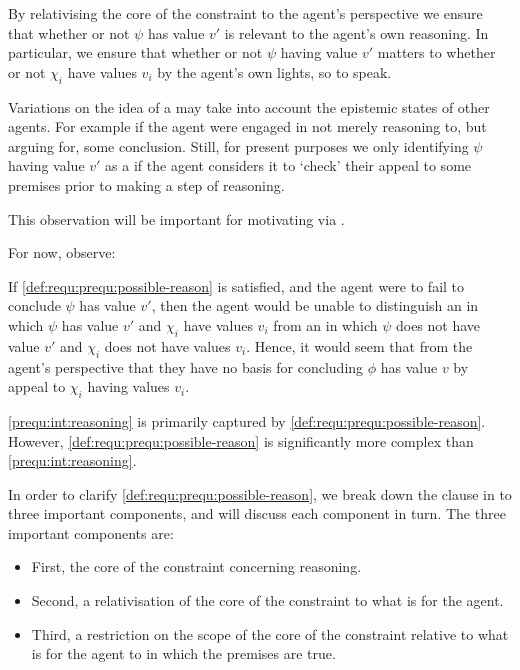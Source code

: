 
\begin{note}[Relevance]
  By relativising the core of the constraint to the agent's perspective we ensure that whether or not \(\psi\) has value \(v'\) is relevant to the agent's own reasoning.
  In particular, we ensure that whether or not \(\psi\) having value \(v'\) matters to whether or not \(\chi_{i}\) have values \(v_{i}\) by the agent's own lights, so to speak.

  Variations on the idea of a \prequ{} may take into account the epistemic states of other agents. For example if the agent were engaged in not merely reasoning to, but arguing for, some conclusion.
  Still, for present purposes we only identifying \(\psi\) having value \(v'\) as a \prequ{} if the agent considers it \epVAd{} to `check' their appeal to some premises prior to making a step of reasoning.

  This observation will be important for motivating \ideaCS{} via \ideaS{}.

  For now, observe:

  If \ref{def:requ:prequ:possible-reason} is satisfied, and the agent were to fail to conclude \(\psi\) has value \(v'\), then the agent would be unable to distinguish an \epVW{} in which \(\psi\) has value \(v'\) and \(\chi_{i}\) have values \(v_{i}\) from an \epVW{} in which \(\psi\) does not have value \(v'\) and \(\chi_{i}\) does not have values \(v_{i}\).
  Hence, it would seem that from the agent's perspective that they have no basis for concluding \(\phi\) has value \(v\) by appeal to \(\chi_{i}\) having values \(v_{i}\).
\end{note}


\begin{note}
  \ref{prequ:int:reasoning} is primarily captured by \ref{def:requ:prequ:possible-reason}.
  However, \ref{def:requ:prequ:possible-reason} is significantly more complex than \ref{prequ:int:reasoning}.

  In order to clarify \ref{def:requ:prequ:possible-reason}, we break down the clause in to three important components, and will discuss each component in turn.
  The three important components are:
  \begin{itemize}
  \item
    First, the core of the constraint concerning reasoning.
  \item
    Second, a relativisation of the core of the constraint to what is \epVAd{} for the agent.
  \item
    Third, a restriction on the scope of the core of the constraint relative to what is \epVAd{} for the agent to  in which the premises are true.
  \end{itemize}
\end{note}

